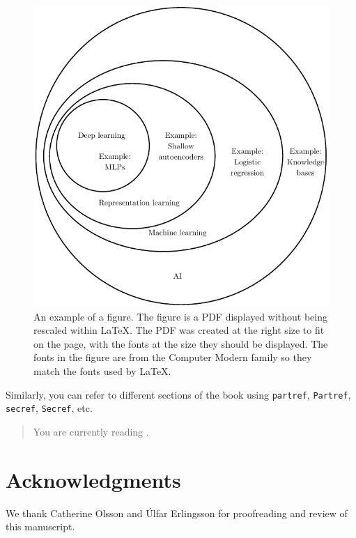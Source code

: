 \begin{figure}[t!]
\centering
\includegraphics{venn}
\caption{An example of a figure.
The figure is a PDF displayed without being rescaled within {\LaTeX}.
The PDF was created at the right size to fit on the page, with the
fonts at the size they should be displayed. The fonts in the figure
are from the Computer Modern family so they match the fonts used
by \LaTeX.}
\label{fig:venn}
\end{figure}

Similarly, you can refer to different sections of the book using
{\tt partref}, {\tt Partref}, {\tt secref}, {\tt Secref}, etc.

\begin{quote}
	You are currently reading .
\end{quote}

\section*{Acknowledgments}
We thank Catherine Olsson and \'Ulfar Erlingsson for proofreading and
review of this manuscript.



\clearpage
